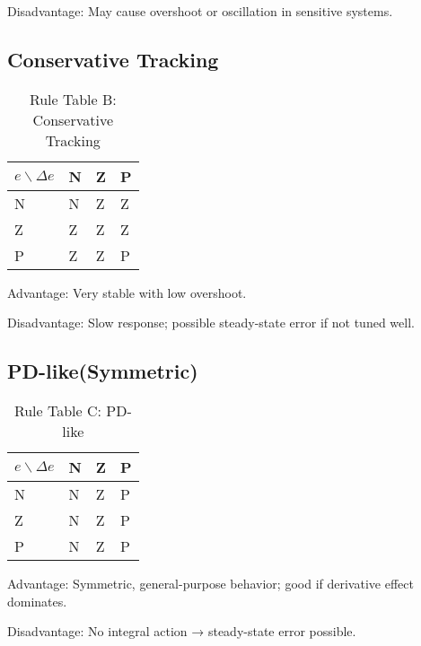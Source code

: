Disadvantage: May cause overshoot or oscillation in sensitive systems.


\subsection{Conservative Tracking}
\begin{table}[h]
\centering
\caption{Rule Table B: Conservative Tracking}
\begin{tabular}{llll}
\toprule
{$e\backslash \Delta e$} & N & Z & P \\
\midrule
N & N & Z & Z \\
Z & Z & Z & Z \\
P & Z & Z & P \\
\bottomrule
\end{tabular}
\end{table}
Advantage: Very stable with low overshoot.

Disadvantage: Slow response; possible steady-state error if not tuned well.

\subsection{PD-like(Symmetric)}
\begin{table}[h]
\centering
\caption{Rule Table C: PD-like}
\begin{tabular}{llll}
\toprule
{$e\backslash \Delta e$} & N & Z & P \\
\midrule
N & N & Z & P \\
Z & N & Z & P \\
P & N & Z & P \\
\bottomrule
\end{tabular}
\end{table}
Advantage: Symmetric, general-purpose behavior; good if derivative effect dominates.

Disadvantage: No integral action → steady-state error possible.


